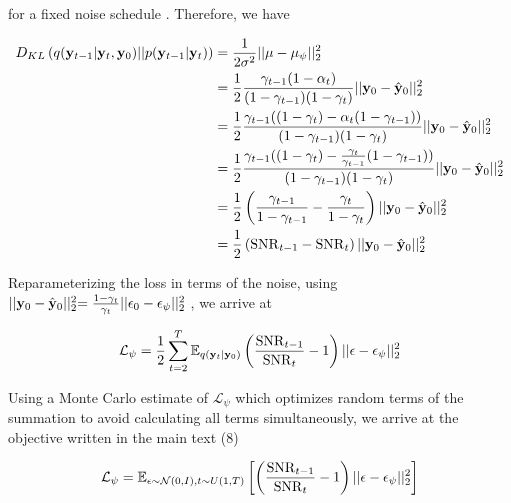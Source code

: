 for a fixed noise schedule \parencite{Saharia2021}. Therefore, we have

\begin{align*}
D_{KL}\left(q(\bold{y}_{t-1}\lvert\bold{y}_t,\bold{y}_0)\lvert\lvert p(\bold{y}_{t-1}\lvert\bold{y}_t) \right) &= \frac{1}{2\sigma^{2}} \lvert\lvert \mu - \mu_{\psi} \lvert\lvert_{2}^{2} \\
&= \frac{1}{2}\frac{\gamma_{t-1}(1-\alpha_{t})}{(1-\gamma_{t-1})(1-\gamma_{t})}\lvert\lvert \bold{y}_{0} - \hat{\bold{y}}_{0} \lvert\lvert_{2}^{2}\\
&= \frac{1}{2}\frac{\gamma_{t-1}((1-\gamma_{t})-\alpha_{t}(1-\gamma_{t-1}))}{(1-\gamma_{t-1})(1-\gamma_{t})}\lvert\lvert \bold{y}_{0} - \hat{\bold{y}}_{0} \lvert\lvert_{2}^{2}\\
&= \frac{1}{2}\frac{\gamma_{t-1}((1-\gamma_{t})-\frac{\gamma_{t}}{\gamma_{t-1}}(1-\gamma_{t-1}))}{(1-\gamma_{t-1})(1-\gamma_{t})}\lvert\lvert \bold{y}_{0} - \hat{\bold{y}}_{0} \lvert\lvert_{2}^{2}\\
&= \frac{1}{2}\left(\frac{\gamma_{t-1}}{1-\gamma_{t-1}}-\frac{\gamma_{t}}{1-\gamma_{t}}\right)\lvert\lvert \bold{y}_{0} - \hat{\bold{y}}_{0} \lvert\lvert_{2}^{2}\\
&= \frac{1}{2}\left(\mathrm{SNR}_{t-1}-\mathrm{SNR}_{t}\right)\lvert\lvert \bold{y}_{0} - \hat{\bold{y}}_{0} \lvert\lvert_{2}^{2}
\end{align*}

Reparameterizing the loss in terms of the noise, using $\lvert\lvert \bold{y}_{0} - \hat{\bold{y}}_{0} \lvert\lvert_{2}^{2} = \frac{1-\gamma_{t}}{\gamma_{t}}\lvert\lvert \bold{\epsilon}_{0} - \epsilon_{\psi} \lvert\lvert_{2}^{2}$ \parencite{Ribeiro2024}, we arrive at 

\begin{equation*}
\mathcal{L}_{\psi} = \frac{1}{2}\sum_{t=2}^{T} \mathbb{E}_{q(\bold{y}_{t}\lvert\bold{y}_{0})}\left(\frac{\mathrm{SNR}_{t-1}}{{\mathrm{SNR}_{t}}}-1\right)\lvert\lvert \bold{\epsilon}-\bold{\epsilon}_{\psi}\lvert\lvert_{2}^{2}
\end{equation*}

Using a Monte Carlo estimate of $\mathcal{L}_{\psi}$ \parencite{Kingma2023} which optimizes random terms of the summation to avoid calculating all terms simultaneously, we arrive at the objective written in the main text (8)

\begin{equation*}
\mathcal{L}_{\psi} = \mathbb{E}_{\epsilon\sim \mathcal{N}(0,I),t\sim U(1,T)}\left[\left(\frac{\mathrm{SNR}_{t-1}}{{\mathrm{SNR}_{t}}}-1\right)\lvert\lvert \bold{\epsilon}-\bold{\epsilon}_{\psi}\lvert\lvert_{2}^{2}\right]
\end{equation*}


